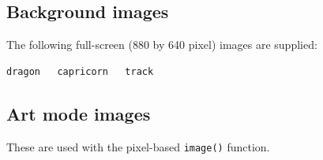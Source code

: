 \documentclass[12pt,a4paper,twoside]{article}
\renewcommand{\_}{\texttt{\symbol{95}}}
\begin{document}
\subsection{Background images}
\label{backgrounds}

The following full-screen (880 by 640 pixel) images are supplied:
\begin{verbatim}
dragon   capricorn   track
\end{verbatim}

\newpage
\subsection{Art mode images}

These are used with the pixel-based \verb^image()^ function.

\label{images}
\end{document}
